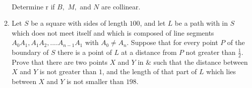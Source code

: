 \documentclass[12pt,-letter paper]{article}
\begin{document}
\begin{enumerate}
\begin{align*}
		    \end{align*}
 Determine r if $B,$ $M,$ and $N$ are collinear.
\item Let $S$ be a square with sides of length $100$, and let $L$ be a path with in $S$ which does not meet itself and which is composed of line segments $A_0A_1, A_1A_2,.... A_{n-1}A_1$ with $A_0 \neq A_n$. Suppose that for every point $P$ of the boundary of $S$ there is a point of $L$ at a distance from $P$ not greater than $\frac{1}{2}$. Prove that there are two points $X$ and $Y$ in  $\&$ such that the distance between $X$ and $Y$ is not greater than $1$, and the length of that part of $L$ which lies between $X$ and $Y$ is not smaller than $198$.
    \end{enumerate}
    
\end{document}
